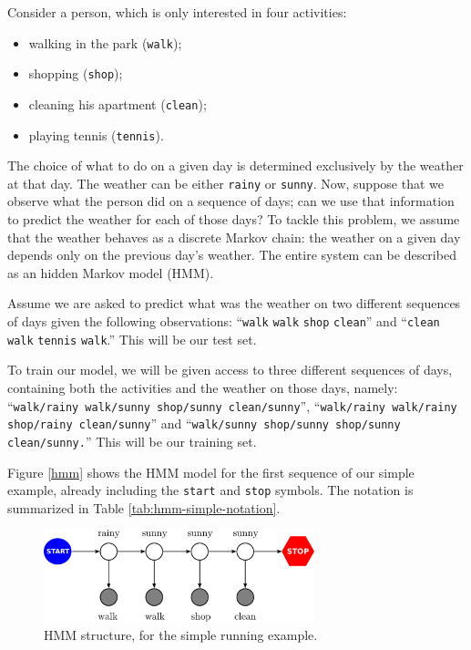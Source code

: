 \begin{example}

Consider a person, which is only interested in four activities: 
\begin{itemize}
\item walking in
the park ({\tt walk});
\item shopping ({\tt shop});
\item cleaning his apartment ({\tt clean});
\item playing tennis ({\tt tennis}).
\end{itemize}
The choice of what to do on a given day is determined exclusively by the weather at that day. The
weather can be either {\tt rainy} or {\tt sunny}. 
Now, suppose that we observe what the person did on a sequence of days; 
can we use that information to predict the weather for each of those days? 
To tackle this problem, we assume 
that the weather behaves as a discrete Markov chain: the weather on a
given day depends only on 
the previous day's  weather. 
The entire system can be described as an hidden Markov model (HMM).

Assume we are asked to predict what was the weather on two different
sequences of days given the following observations: ``{\tt walk} {\tt walk} {\tt shop}
{\tt clean}''  and 
``{\tt clean} {\tt walk} {\tt tennis}
{\tt walk}.''
This will be our test set.

To train our model, we will be given access to three different sequences of
days, containing both the activities and the weather on those days, namely: 
``{\tt walk/rainy walk/sunny shop/sunny
clean/sunny}'', ``{\tt walk/rainy walk/rainy shop/rainy clean/sunny}'' and ``{\tt walk/sunny shop/sunny shop/sunny clean/sunny.}'' This
will be our training set.


Figure \ref{hmm} shows the HMM model for the first sequence of our simple
example, already including the {\tt start} and 
{\tt stop} symbols. The notation is summarized in Table \ref{tab:hmm-simple-notation}.
\end{example}
 



\begin{figure}[ht]
\centering
\includegraphics[width=0.7\textwidth]{figs/sequences/hmm_new}
\caption[HMM running example]{\label{fig:hmm}HMM structure, for the simple
running example.}
\end{figure}

